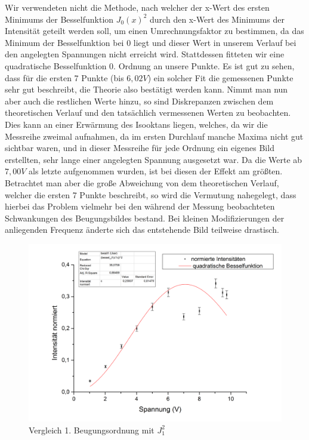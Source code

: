 \clearpage
Wir verwendeten nicht die Methode, nach welcher der x-Wert des ersten Minimums der Besselfunktion $J_{0}(x)^{2}$ durch den x-Wert des Minimums der Intensität geteilt werden soll, um einen Umrechnungsfaktor zu bestimmen, da das Minimum der Besselfunktion bei 0 liegt und dieser Wert in unserem Verlauf bei den angelegten Spannungen nicht erreicht wird. Stattdessen fitteten wir eine quadratische Besselfunktion 0. Ordnung an unsere Punkte. Es ist gut zu sehen, dass für die ersten 7 Punkte (bis $6,02 V$) ein solcher Fit die gemessenen Punkte sehr gut beschreibt, die Theorie also bestätigt werden kann. Nimmt man nun aber auch die restlichen Werte hinzu, so sind Diskrepanzen zwischen dem theoretischen Verlauf und den tatsächlich vermessenen Werten zu beobachten. Dies kann an einer Erwärmung des Isooktans liegen, welches, da wir die Messreihe zweimal aufnahmen, da im ersten Durchlauf manche Maxima nicht gut sichtbar waren, und in dieser Messreihe für jede Ordnung ein eigenes Bild erstellten, sehr lange einer angelegten Spannung ausgesetzt war. Da die Werte ab $7,00V$ als letzte aufgenommen wurden, ist bei diesen der Effekt am größten. Betrachtet man aber die große Abweichung von dem theoretischen Verlauf, welcher die ersten 7 Punkte beschreibt, so wird die Vermutung nahegelegt, dass hierbei das Problem vielmehr bei den während der Messung beobachteten Schwankungen des Beugungsbildes bestand. Bei kleinen Modifizierungen der anliegenden Frequenz änderte sich das entstehende Bild teilweise drastisch.\\
\begin{center}
\begin{figure}[htbp]
\includegraphics[scale=0.5]{Bilder/bessel1}
\caption{Vergleich 1. Beugungsordnung mit $J_{1}^{2}$}
\end{figure}
\end{center}
